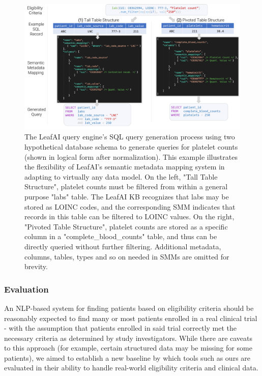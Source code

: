 \documentclass[../main.tex]{subfiles}
\begin{document}
\begin{figure}[h]
  \includegraphics[scale=0.56]{Figures/Aim2/aim2_leafai_smm.pdf}  
\caption{The LeafAI query engine's SQL query generation process using two hypothetical database schema to generate queries for platelet counts (shown in logical form after normalization). This example illustrates the flexibility of LeafAI's semantic metadata mapping system in adapting to virtually any data model. On the left, "Tall Table Structure", platelet counts must be filtered from within a general purpose "labs" table. The LeafAI KB recognizes that labs may be stored as LOINC codes, and the corresponding SMM indicates that records in this table can be filtered to LOINC values. On the right, "Pivoted Table Structure", platelet counts are stored as a specific column in a "complete\_blood\_counts" table, and thus can be directly queried without further filtering. Additional metadata, columns, tables, types and so on needed in SMMs are omitted for brevity.}
\label{aim2_fig_leafai_smm}
\end{figure}

\subsubsection{Evaluation}
An NLP-based system for finding patients based on eligibility criteria should be reasonably expected to find many or most patients enrolled in a real clinical trial - with the assumption that patients enrolled in said trial correctly met the necessary criteria as determined by study investigators. While there are caveats to this approach (for example, certain structured data may be missing for some patients), we aimed to establish a new baseline by which tools such as ours are evaluated in their ability to handle real-world eligibility criteria and clinical data.
\end{document}
